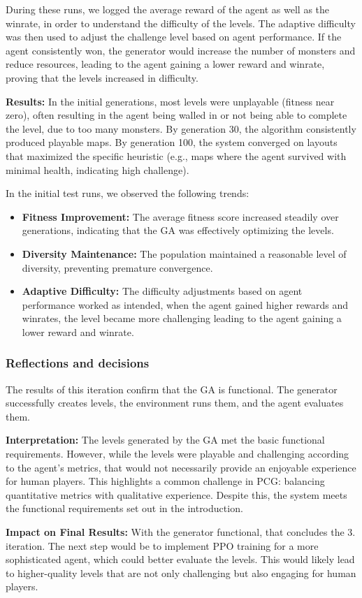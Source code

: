 During these runs, we logged the average reward of the agent as well as the winrate, in order to understand the difficulty of the levels. The adaptive difficulty was then used to adjust the challenge level based on agent performance.
If the agent consistently won, the generator would increase the number of monsters and reduce resources, leading to the agent gaining a lower reward and winrate, proving that the levels increased in difficulty.

\textbf{Results:}
In the initial generations, most levels were unplayable (fitness near zero), often resulting in the agent being walled in or not being able to complete the level, due to too many monsters.
By generation 30, the algorithm consistently produced playable maps.
By generation 100, the system converged on layouts that maximized the specific heuristic (e.g., maps where the agent survived with minimal health, indicating high challenge).

In the initial test runs, we observed the following trends:
\begin{itemize}
    \item \textbf{Fitness Improvement:} The average fitness score increased steadily over generations, indicating that the GA was effectively optimizing the levels.
    \item \textbf{Diversity Maintenance:} The population maintained a reasonable level of diversity, preventing premature convergence.
    \item \textbf{Adaptive Difficulty:} The difficulty adjustments based on agent performance worked as intended, when the agent gained higher rewards and winrates, the level became more challenging leading to the agent gaining a lower reward and winrate.
\end{itemize}

\subsubsection{Reflections and decisions}
The results of this iteration confirm that the GA is functional.
The generator successfully creates levels, the environment runs them, and the agent evaluates them.

\textbf{Interpretation:}
The levels generated by the GA met the basic functional requirements.
However, while the levels were playable and challenging according to the agent's metrics, that would not necessarily provide an enjoyable experience for human players.
This highlights a common challenge in PCG: balancing quantitative metrics with qualitative experience.
Despite this, the system meets the functional requirements set out in the introduction.

\textbf{Impact on Final Results:}
With the generator functional, that concludes the 3. iteration.
The next step would be to implement PPO training for a more sophisticated agent, which could better evaluate the levels.
This would likely lead to higher-quality levels that are not only challenging but also engaging for human players.
